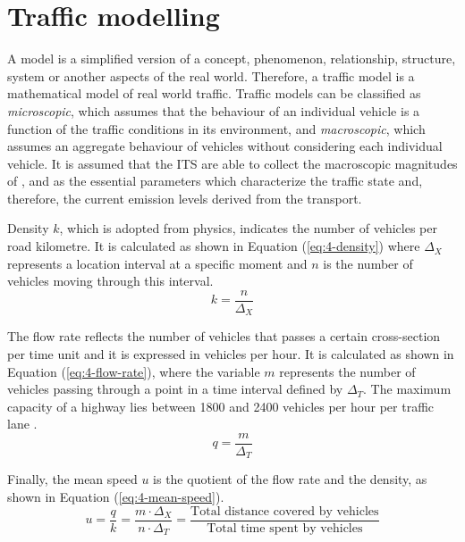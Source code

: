 \section{Traffic modelling}
A model is a simplified version of a concept, phenomenon, relationship, structure, system or another aspects of the real world. Therefore, a traffic model is a mathematical model of real world traffic. Traffic models can be classified as \textit{microscopic}, which assumes that the behaviour of an individual vehicle is a function of the traffic conditions in its environment, and \textit{macroscopic}, which assumes an aggregate behaviour of vehicles without considering each individual vehicle. It is assumed that the \ac{ITS} are able to collect the macroscopic magnitudes of ,  and  as the essential parameters which characterize the traffic state and, therefore, the current emission levels derived from the transport.

Density $k$, which is adopted from physics, indicates the number of vehicles per road kilometre. It is calculated as shown in Equation (\ref{eq:4-density}) where ${ \Delta  }_{ X }$ represents a location interval at a specific moment and $n$ is the number of vehicles moving through this interval.
\begin{equation} \label{eq:4-density}
k = \frac { n }{ { \Delta  }_{ X } } 
\end{equation}

The flow rate reflects the number of vehicles that passes a certain cross-section per time unit and it is expressed in vehicles per hour. It is calculated as shown in Equation (\ref{eq:4-flow-rate}), where the variable $m$ represents the number of vehicles passing through a point in a time interval defined by ${ \Delta  }_{ T }$. The maximum capacity of a highway lies between 1800 and 2400 vehicles per hour per traffic lane \cite{HCM2000}.
\begin{equation} \label{eq:4-flow-rate}
q = \frac { m }{ { \Delta  }_{ T } } 
\end{equation}

Finally, the mean speed $u$ is the quotient of the flow rate and the density, as shown in Equation (\ref{eq:4-mean-speed}).
\begin{equation} \label{eq:4-mean-speed}
u = \frac { q }{ k } = \frac{m \cdot {\Delta  }_{ X }}{n \cdot {\Delta  }_{ T }} = \frac { \text{Total  distance  covered  by  vehicles} }{ \text{Total  time  spent  by  vehicles} } 
\end{equation}

